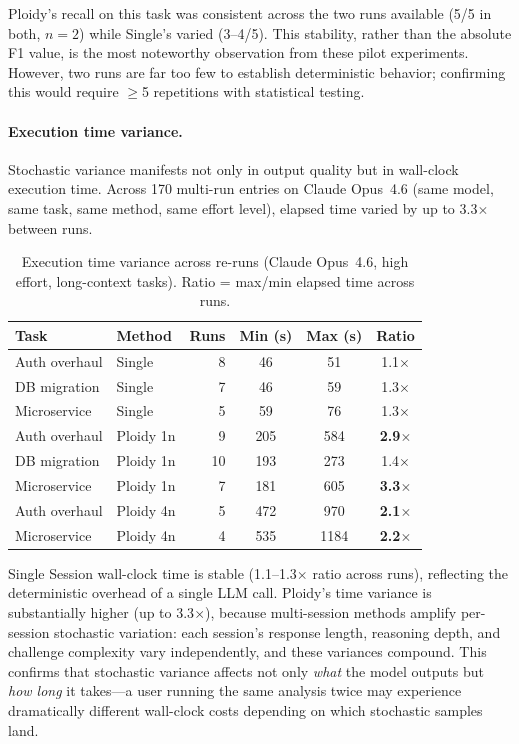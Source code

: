 \documentclass[11pt]{article}
\begin{document}
Ploidy's recall on this task was consistent across the two runs available (5/5 in both, $n{=}2$) while Single's varied (3--4/5). This stability, rather than the absolute F1 value, is the most noteworthy observation from these pilot experiments. However, two runs are far too few to establish deterministic behavior; confirming this would require $\geq$5 repetitions with statistical testing.

\paragraph{Execution time variance.} Stochastic variance manifests not only in output quality but in wall-clock execution time. Across 170 multi-run entries on Claude Opus~4.6 (same model, same task, same method, same effort level), elapsed time varied by up to 3.3$\times$ between runs.

\begin{table}[H]
\centering
\caption{Execution time variance across re-runs (Claude Opus~4.6, high effort, long-context tasks). Ratio = max/min elapsed time across runs.}
\label{tab:time-variance}
\small
\begin{tabular}{@{}llrccc@{}}
\toprule
\textbf{Task} & \textbf{Method} & \textbf{Runs} & \textbf{Min (s)} & \textbf{Max (s)} & \textbf{Ratio} \\
\midrule
Auth overhaul    & Single    & 8  & 46   & 51   & 1.1$\times$ \\
DB migration     & Single    & 7  & 46   & 59   & 1.3$\times$ \\
Microservice     & Single    & 5  & 59   & 76   & 1.3$\times$ \\
\midrule
Auth overhaul    & Ploidy 1n & 9  & 205  & 584  & \textbf{2.9$\times$} \\
DB migration     & Ploidy 1n & 10 & 193  & 273  & 1.4$\times$ \\
Microservice     & Ploidy 1n & 7  & 181  & 605  & \textbf{3.3$\times$} \\
\midrule
Auth overhaul    & Ploidy 4n & 5  & 472  & 970  & \textbf{2.1$\times$} \\
Microservice     & Ploidy 4n & 4  & 535  & 1184 & \textbf{2.2$\times$} \\
\bottomrule
\end{tabular}
\end{table}

Single Session wall-clock time is stable (1.1--1.3$\times$ ratio across runs), reflecting the deterministic overhead of a single LLM call. Ploidy's time variance is substantially higher (up to 3.3$\times$), because multi-session methods amplify per-session stochastic variation: each session's response length, reasoning depth, and challenge complexity vary independently, and these variances compound. This confirms that stochastic variance affects not only \emph{what} the model outputs but \emph{how long} it takes---a user running the same analysis twice may experience dramatically different wall-clock costs depending on which stochastic samples land.
\end{document}
